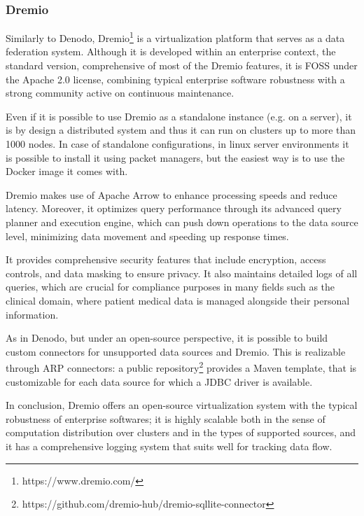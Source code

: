 \subsubsection{Dremio}
Similarly to Denodo, Dremio\footnote{https://www.dremio.com/} is a virtualization platform that serves as a data federation system. Although it is developed within an enterprise context, the standard version, comprehensive of most of the Dremio features, it is \ac{FOSS} under the Apache 2.0 license, combining typical enterprise software robustness with a strong community active on continuous maintenance.

Even if it is possible to use Dremio as a standalone instance (e.g. on a server), it is by design a distributed system and thus it can run on clusters up to more than 1000 nodes. In case of standalone configurations, in linux server environments it is possible to install it using packet managers, but the easiest way is to use the Docker image it comes with.

Dremio makes use of Apache Arrow to enhance processing speeds and reduce latency. Moreover, it optimizes query performance through its advanced query planner and execution engine, which can push down operations to the data source level, minimizing data movement and speeding up response times.

It provides comprehensive security features that include encryption, access controls, and data masking to ensure privacy. It also maintains detailed logs of all queries, which are crucial for compliance purposes in many fields such as the clinical domain, where patient medical data is managed alongside their personal information.

As in Denodo, but under an open-source perspective, it is possible to build custom connectors for unsupported data sources and Dremio. This is realizable through \ac{ARP} connectors: a public repository\footnote{https://github.com/dremio-hub/dremio-sqllite-connector} provides a Maven template, that is customizable for each data source for which a \ac{JDBC} driver is available.

In conclusion, Dremio offers an open-source virtualization system with the typical robustness of enterprise softwares; it is highly scalable both in the sense of computation distribution over clusters and in the types of supported sources, and it has a comprehensive logging system that suits well for tracking data flow.


